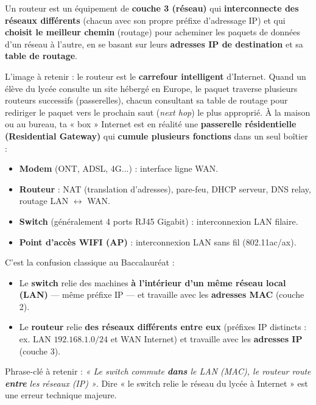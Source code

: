 \documentclass[11pt]{article}
\newcommand{\cle}[1]{{\popxbold\color{popdark}#1}}
\newcounter{popsec}
\newcounter{popsub}
\newcommand{\courssub}[1]{%
  \stepcounter{popsub}%
  \par\vspace{9pt}\noindent{\popxbold\fontsize{11.5}{13}\selectfont\color{popink}{\color{poporange}\thepopsec.\thepopsub}\hspace{6pt}#1}\par\nopagebreak\vspace{4pt}
}
\begin{document}
\courssub{Le routeur}

\begin{definition}[Routeur]
Un \cle{routeur} est un équipement de \textbf{couche 3 (réseau)} qui \textbf{interconnecte des réseaux différents} (chacun avec son propre préfixe d'adressage IP) et qui \textbf{choisit le meilleur chemin} (routage) pour acheminer les paquets de données d'un réseau à l'autre, en se basant sur leurs \textbf{adresses IP de destination} et sa \textbf{table de routage}.
\end{definition}

L'image à retenir : le routeur est le \textbf{carrefour intelligent} d'Internet. Quand un élève du lycée consulte un site hébergé en Europe, le paquet traverse plusieurs routeurs successifs (passerelles), chacun consultant sa table de routage pour rediriger le paquet vers le prochain saut (\emph{next hop}) le plus approprié. À la maison ou au bureau, ta « box » Internet est en réalité une \textbf{passerelle résidentielle (Residential Gateway)} qui \textbf{cumule plusieurs fonctions} dans un seul boîtier :
\begin{itemize}
\item \textbf{Modem} (ONT, ADSL, 4G...) : interface ligne WAN.
\item \textbf{Routeur} : NAT (translation d'adresses), pare-feu, DHCP serveur, DNS relay, routage LAN $\leftrightarrow$ WAN.
\item \textbf{Switch} (généralement 4 ports RJ45 Gigabit) : interconnexion LAN filaire.
\item \textbf{Point d'accès WIFI (AP)} : interconnexion LAN sans fil (802.11ac/ax).
\end{itemize}

\begin{attention}
C'est la confusion classique au Baccalauréat :
\begin{itemize}
\item Le \textbf{switch} relie des machines \textbf{à l'intérieur d'un même réseau local (LAN)} — même préfixe IP — et travaille avec les \textbf{adresses MAC} (couche 2).
\item Le \textbf{routeur} relie \textbf{des réseaux différents entre eux} (préfixes IP distincts : ex. LAN $192.168.1.0/24$ et WAN Internet) et travaille avec les \textbf{adresses IP} (couche 3).
\end{itemize}
Phrase-clé à retenir : \emph{« Le switch commute \textbf{dans} le LAN (MAC), le routeur route \textbf{entre} les réseaux (IP) »}. Dire « le switch relie le réseau du lycée à Internet » est une erreur technique majeure.
\end{attention}
\end{document}
